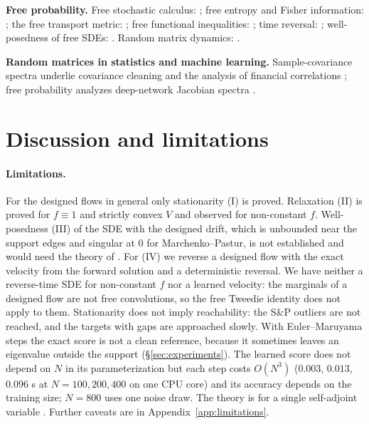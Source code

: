 \documentclass[11pt]{article}
\theoremstyle{plain}
\theoremstyle{definition}
\theoremstyle{remark}
\begin{document}
\textbf{Free probability.} Free stochastic calculus: \citet{BianeSpeicher1998,Biane1997,Biane1998};
free entropy and Fisher information: \citet{Voiculescu1993,Voiculescu1998}; the free transport
metric: \citet{BianeVoiculescu2001}; free functional inequalities:
\citet{Biane2003,HiaiPetzUeda2004,LedouxPopescu2009}; time reversal: \citet{Dabrowski2014};
well-posedness of free SDEs: \citet{BianeSpeicher1998,WeiYin2026}. Random matrix dynamics:
\citet{Dyson1962,RogersShi1993,Bru1989}.

\textbf{Random matrices in statistics and machine learning.} Sample-covariance spectra underlie
covariance cleaning \citep{LedoitWolf2012,Bun2017} and the analysis of financial correlations
\citep{Laloux1999,Plerou2002}; free probability analyzes deep-network Jacobian spectra
\citep{Pennington2018}.

\section{Discussion and limitations}\label{sec:limitations}

\paragraph{Limitations.} For the designed flows in general only stationarity (I) is proved. Relaxation (II) is proved for $f\equiv1$
and strictly convex $V$ and observed for non-constant $f$. Well-posedness (III) of the SDE with the designed drift, which is unbounded
near the support edges and singular at $0$ for Marchenko--Pastur, is not established and would need the theory of \citet{WeiYin2026}.
For (IV) we reverse a designed flow with the exact velocity from the forward solution and a deterministic reversal. We have neither a
reverse-time SDE for non-constant $f$ nor a learned velocity: the marginals of a designed flow are not free convolutions, so the free
Tweedie identity does not apply to them. Stationarity does not imply reachability: the S\&P outliers are not reached, and the targets with gaps are approached slowly. With Euler--Maruyama steps the exact score is not a clean reference, because it sometimes leaves an eigenvalue outside the support (\S\ref{sec:experiments}). The learned score does not
depend on $N$ in its parameterization but each step costs $O(N^3)$ ($0.003$, $0.013$, $0.096$ s at $N=100,200,400$ on one CPU core) and its accuracy depends on the training size; $N=800$ uses one
noise draw. The theory is for a single self-adjoint variable \citep{BianeVoiculescu2001}. Further caveats are in Appendix~\ref{app:limitations}.
\end{document}
